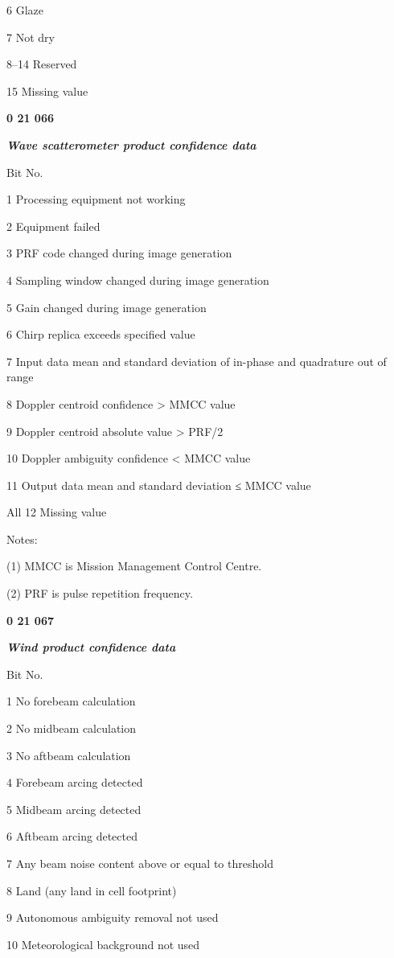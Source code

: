6 Glaze

7 Not dry

8--14 Reserved

15 Missing value

\textbf{0 21 066}

\emph{\textbf{Wave scatterometer product confidence data}}

Bit No.

1 Processing equipment not working

2 Equipment failed

3 PRF code changed during image generation

4 Sampling window changed during image generation

5 Gain changed during image generation

6 Chirp replica exceeds specified value

7 Input data mean and standard deviation of in-phase and quadrature out of range

8 Doppler centroid confidence \textgreater{} MMCC value

9 Doppler centroid absolute value \textgreater{} PRF/2

10 Doppler ambiguity confidence \textless{} MMCC value

11 Output data mean and standard deviation ≤ MMCC value

All 12 Missing value

Notes:

(1) MMCC is Mission Management Control Centre.

(2) PRF is pulse repetition frequency.

\textbf{0 21 067}

\emph{\textbf{Wind product confidence data}}

Bit No.

1 No forebeam calculation

2 No midbeam calculation

3 No aftbeam calculation

4 Forebeam arcing detected

5 Midbeam arcing detected

6 Aftbeam arcing detected

7 Any beam noise content above or equal to threshold

8 Land (any land in cell footprint)

9 Autonomous ambiguity removal not used

10 Meteorological background not used


